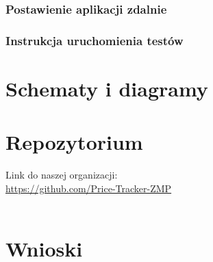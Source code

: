 \documentclass{article}
\begin{document}
        \subsubsection{Postawienie aplikacji zdalnie}
        
        \subsubsection{Instrukcja uruchomienia testów}

\section{Schematy i diagramy}

\section{Repozytorium}
Link do naszej organizacji: \\
\url{https://github.com/Price-Tracker-ZMP}\\\\

\section{Wnioski}
\end{document}
